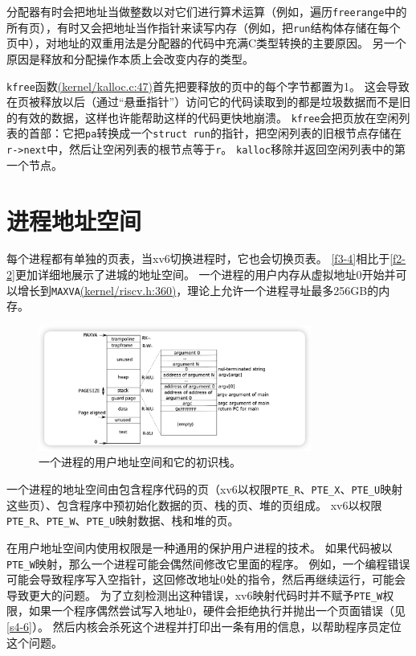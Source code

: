 分配器有时会把地址当做整数以对它们进行算术运算（例如，遍历\texttt{freerange}中的所有页），有时又会把地址当作指针来读写内存（例如，把\texttt{run}结构体存储在每个页中），对地址的双重用法是分配器的代码中充满C类型转换的主要原因。
另一个原因是释放和分配操作本质上会改变内存的类型。

\texttt{kfree}函数\href{https://github.com/mit-pdos/xv6-riscv/blob/riscv//kernel/kalloc.c#L47}{(kernel/kalloc.c:47)}首先把要释放的页中的每个字节都置为1。
这会导致在页被释放以后（通过“悬垂指针”）访问它的代码读取到的都是垃圾数据而不是旧的有效的数据，这样也许能帮助这样的代码更快地崩溃。
\texttt{kfree}会把页放在空闲列表的首部：它把\texttt{pa}转换成一个\texttt{struct run}的指针，把空闲列表的旧根节点存储在\texttt{r->next}中，然后让空闲列表的根节点等于\texttt{r}。
\texttt{kalloc}移除并返回空闲列表中的第一个节点。

\section{进程地址空间}
每个进程都有单独的页表，当xv6切换进程时，它也会切换页表。
\autoref{f3-4}相比于\autoref{f2-2}更加详细地展示了进城的地址空间。
一个进程的用户内存从虚拟地址0开始并可以增长到\texttt{MAXVA}\href{https://github.com/mit-pdos/xv6-riscv/blob/riscv//kernel/riscv.h#L360}{(kernel/riscv.h:360)}，理论上允许一个进程寻址最多256GB的内存。

\begin{figure}[htbp]
    \centering
    \includegraphics[width=0.8\textwidth]{../imgs/f3-4.png}
    \caption{一个进程的用户地址空间和它的初识栈。}
    \label{f3-4}
\end{figure}

一个进程的地址空间由包含程序代码的页（xv6以权限\texttt{PTE\_R}、\texttt{PTE\_X}、\texttt{PTE\_U}映射这些页）、包含程序中预初始化数据的页、栈的页、堆的页组成。
xv6以权限\texttt{PTE\_R}、\texttt{PTE\_W}、\texttt{PTE\_U}映射数据、栈和堆的页。

在用户地址空间内使用权限是一种通用的保护用户进程的技术。
如果代码被以\texttt{PTE\_W}映射，那么一个进程可能会偶然间修改它里面的程序。
例如，一个编程错误可能会导致程序写入空指针，这回修改地址0处的指令，然后再继续运行，可能会导致更大的问题。
为了立刻检测出这种错误，xv6映射代码时并不赋予\texttt{PTE\_W}权限，如果一个程序偶然尝试写入地址0，硬件会拒绝执行并抛出一个页面错误（见\autoref{s4-6}）。
然后内核会杀死这个进程并打印出一条有用的信息，以帮助程序员定位这个问题。


